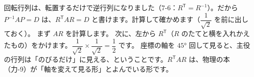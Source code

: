回転行列は、転置するだけで逆行列になりました（7-6：$R^{\mathsf T}=R^{-1}$）。だから $P^{-1}AP=D$ は、$R^{\mathsf T}AR=D$ と書けます。計算して確かめます（$\dfrac{1}{\sqrt2}$ を前に出しておく）。
まず $AR$ を計算します。
次に、左から $R^{\mathsf T}$（$R$ のたてと横を入れかえたもの）をかけます。$\dfrac{1}{\sqrt2}\times\dfrac{1}{\sqrt2}=\dfrac12$ です。
座標の軸を $45°$ 回して見ると、主役の行列は「のびるだけ」に見える、ということです。$R^{\mathsf T}AR$ は、物理の本（力-9）が「軸を変えて見る形」とよんでいる形です。

